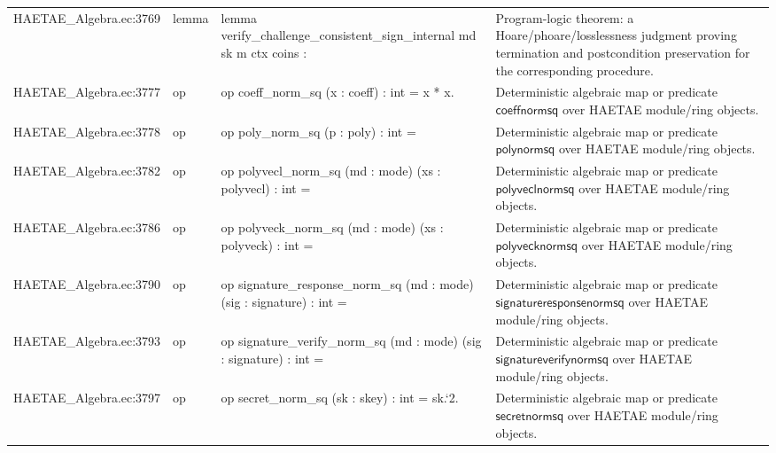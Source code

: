 \documentclass[10pt]{article}
\begin{document}
\begin{longtable}{L{0.11\textwidth}L{0.055\textwidth}L{0.385\textwidth}L{0.41\textwidth}}
HAETAE\_\allowbreak{}Algebra.\allowbreak{}ec:\allowbreak{}3769 & lemma & {\ttfamily\scriptsize lemma verify\_\allowbreak{}challenge\_\allowbreak{}consistent\_\allowbreak{}sign\_\allowbreak{}internal md sk m ctx coins :} & Program-logic theorem: a Hoare/phoare/losslessness judgment proving termination and postcondition preservation for the corresponding procedure. \\
HAETAE\_\allowbreak{}Algebra.\allowbreak{}ec:\allowbreak{}3777 & op & {\ttfamily\scriptsize op coeff\_\allowbreak{}norm\_\allowbreak{}sq (x : coeff) : int = x * x.} & Deterministic algebraic map or predicate $\mathsf{coeffnormsq}$ over HAETAE module/ring objects. \\
HAETAE\_\allowbreak{}Algebra.\allowbreak{}ec:\allowbreak{}3778 & op & {\ttfamily\scriptsize op poly\_\allowbreak{}norm\_\allowbreak{}sq (p : poly) : int =} & Deterministic algebraic map or predicate $\mathsf{polynormsq}$ over HAETAE module/ring objects. \\
HAETAE\_\allowbreak{}Algebra.\allowbreak{}ec:\allowbreak{}3782 & op & {\ttfamily\scriptsize op polyvecl\_\allowbreak{}norm\_\allowbreak{}sq (md : mode) (xs : polyvecl) : int =} & Deterministic algebraic map or predicate $\mathsf{polyveclnormsq}$ over HAETAE module/ring objects. \\
HAETAE\_\allowbreak{}Algebra.\allowbreak{}ec:\allowbreak{}3786 & op & {\ttfamily\scriptsize op polyveck\_\allowbreak{}norm\_\allowbreak{}sq (md : mode) (xs : polyveck) : int =} & Deterministic algebraic map or predicate $\mathsf{polyvecknormsq}$ over HAETAE module/ring objects. \\
HAETAE\_\allowbreak{}Algebra.\allowbreak{}ec:\allowbreak{}3790 & op & {\ttfamily\scriptsize op signature\_\allowbreak{}response\_\allowbreak{}norm\_\allowbreak{}sq (md : mode) (sig : signature) : int =} & Deterministic algebraic map or predicate $\mathsf{signatureresponsenormsq}$ over HAETAE module/ring objects. \\
HAETAE\_\allowbreak{}Algebra.\allowbreak{}ec:\allowbreak{}3793 & op & {\ttfamily\scriptsize op signature\_\allowbreak{}verify\_\allowbreak{}norm\_\allowbreak{}sq (md : mode) (sig : signature) : int =} & Deterministic algebraic map or predicate $\mathsf{signatureverifynormsq}$ over HAETAE module/ring objects. \\
HAETAE\_\allowbreak{}Algebra.\allowbreak{}ec:\allowbreak{}3797 & op & {\ttfamily\scriptsize op secret\_\allowbreak{}norm\_\allowbreak{}sq (sk : skey) : int = sk.`2.} & Deterministic algebraic map or predicate $\mathsf{secretnormsq}$ over HAETAE module/ring objects. \\

\end{longtable}
\end{document}
